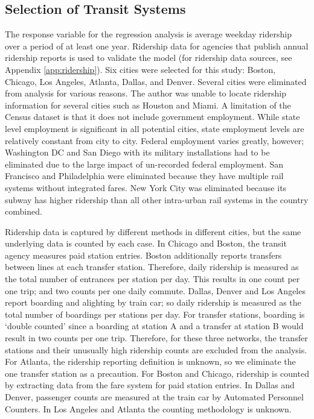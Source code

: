 \documentclass[11pt]{article}
\begin{document}
\subsection{Selection of Transit Systems}

The response variable for the regression analysis is average weekday ridership over a period of at least one year. Ridership data for agencies that publish annual ridership reports is used to validate the model (for ridership data sources, see Appendix \ref{app:ridership}). Six cities were selected for this study: Boston, Chicago, Los Angeles, Atlanta, Dallas, and Denver. Several cities were eliminated from analysis for various reasons. The author was unable to locate ridership information for several cities such as Houston and Miami. A limitation of the Census dataset is that it does not include government employment. While state level employment is significant in all potential cities, state employment levels are relatively constant from city to city. Federal employment varies greatly, however; Washington DC and San Diego with its military installations had to be eliminated due to the large impact of un-recorded federal employment. San Francisco and Philadelphia were eliminated because they have multiple rail systems without integrated fares. New York City was eliminated because its subway has higher ridership than all other intra-urban rail systems in the country combined.

Ridership data is captured by different methods in different cities, but the same underlying data is counted by each case. In Chicago and Boston, the transit agency measures paid station entries. Boston additionally reports transfers between lines at each transfer station. Therefore, daily ridership is measured as the total number of entrances per station per day. This results in one count per one trip; and two counts per one daily commute. Dallas, Denver and Los Angeles report boarding and alighting by train car; so daily ridership is measured as the total number of boardings per stations per day. For transfer stations, boarding is `double counted' since a boarding at station A and a transfer at station B would result in two counts per one trip. Therefore, for these three networks, the transfer stations and their unusually high ridership counts are excluded from the analysis. For Atlanta, the ridership reporting definition is unknown, so we eliminate the one transfer station as a precaution. For Boston and Chicago, ridership is counted by extracting data from the fare system for paid station entries. In Dallas and Denver, passenger counts are measured at the train car by Automated Personnel Counters. In Los Angeles and Atlanta the counting methodology is unknown. 
\end{document}
